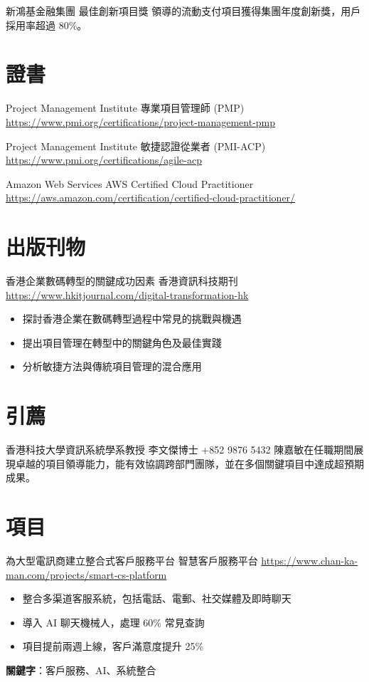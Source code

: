 \documentclass[a4paper, serif, 10pt]{moderncv}
\begin{document}
        {新鴻基金融集團}
        {最佳創新項目獎}
        {}
        {}
        {領導的流動支付項目獲得集團年度創新獎，用戶採用率超過 80\%。}
\section{證書}

        {Project Management Institute}
        {專業項目管理師 (PMP)}
        {\url{https://www.pmi.org/certifications/project-management-pmp}}
        {}
        {}

        {Project Management Institute}
        {敏捷認證從業者 (PMI-ACP)}
        {\url{https://www.pmi.org/certifications/agile-acp}}
        {}
        {}

        {Amazon Web Services}
        {AWS Certified Cloud Practitioner}
        {\url{https://aws.amazon.com/certification/certified-cloud-practitioner/}}
        {}
        {}
\section{出版刊物}

        {香港企業數碼轉型的關鍵成功因素}
        {香港資訊科技期刊}
        {\url{https://www.hkitjournal.com/digital-transformation-hk}}
        {}
        {\begin{itemize}
\item 探討香港企業在數碼轉型過程中常見的挑戰與機遇
\item 提出項目管理在轉型中的關鍵角色及最佳實踐
\item 分析敏捷方法與傳統項目管理的混合應用
\end{itemize}}
\section{引薦}

        {香港科技大學資訊系統學系教授}
        {李文傑博士}
        {+852 9876 5432}
        {}
        {陳嘉敏在任職期間展現卓越的項目領導能力，能有效協調跨部門團隊，並在多個關鍵項目中達成超預期成果。}
\section{項目}

        {為大型電訊商建立整合式客戶服務平台}
        {智慧客戶服務平台}
        {\url{https://www.chan-ka-man.com/projects/smart-cs-platform}}
        {}
        {\begin{itemize}
\item 整合多渠道客服系統，包括電話、電郵、社交媒體及即時聊天
\item 導入 AI 聊天機械人，處理 60\% 常見查詢
\item 項目提前兩週上線，客戶滿意度提升 25\%
\end{itemize}
\textbf{關鍵字}：客戶服務、AI、系統整合}
\end{document}
